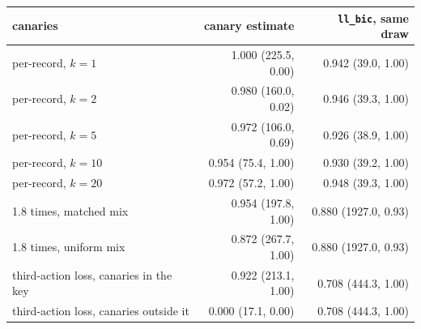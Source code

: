 \begin{tabular}{lrr}
\toprule
canaries & canary estimate & \texttt{ll\_bic}, same draw \\
\midrule
per-record, $k = 1$ & 1.000 (225.5, 0.00) & 0.942 (39.0, 1.00) \\
per-record, $k = 2$ & 0.980 (160.0, 0.02) & 0.946 (39.3, 1.00) \\
per-record, $k = 5$ & 0.972 (106.0, 0.69) & 0.926 (38.9, 1.00) \\
per-record, $k = 10$ & 0.954 (75.4, 1.00) & 0.930 (39.2, 1.00) \\
per-record, $k = 20$ & 0.972 (57.2, 1.00) & 0.948 (39.3, 1.00) \\
1.8 times, matched mix & 0.954 (197.8, 1.00) & 0.880 (1927.0, 0.93) \\
1.8 times, uniform mix & 0.872 (267.7, 1.00) & 0.880 (1927.0, 0.93) \\
third-action loss, canaries in the key & 0.922 (213.1, 1.00) & 0.708 (444.3, 1.00) \\
third-action loss, canaries outside it & 0.000 (17.1, 0.00) & 0.708 (444.3, 1.00) \\
\bottomrule
\end{tabular}
\par{}
